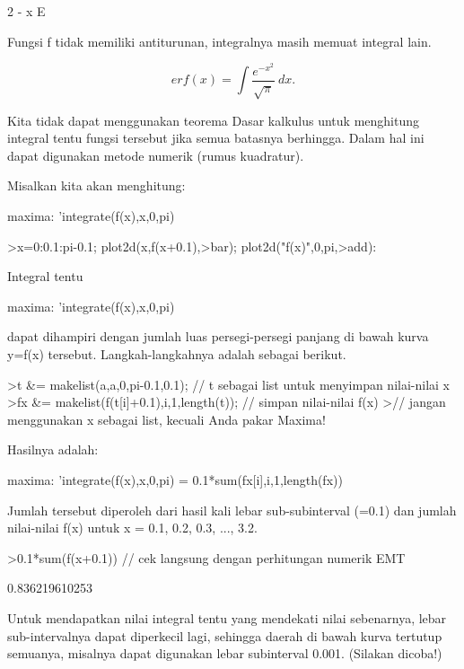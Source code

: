 \documentclass[a4paper,10pt]{article}
\begin{document}
\begin{eulernotebook}
\begin{euleroutput}
                                      2
                                   - x
                                  E
  
\end{euleroutput}
\begin{eulercomment}
Fungsi f tidak memiliki antiturunan, integralnya masih memuat integral lain.

\end{eulercomment}
\begin{eulerformula}
\[
erf(x) = \int \frac{e^{-x^2}}{\sqrt{\pi}} \ dx.
\]
\end{eulerformula}
\begin{eulercomment}
Kita tidak dapat menggunakan teorema Dasar kalkulus untuk menghitung integral tentu fungsi tersebut jika semua batasnya berhingga.
Dalam hal ini dapat digunakan metode numerik (rumus kuadratur).

Misalkan kita akan menghitung:

maxima: 'integrate(f(x),x,0,pi)
\end{eulercomment}
\begin{eulerprompt}
>x=0:0.1:pi-0.1; plot2d(x,f(x+0.1),>bar); plot2d("f(x)",0,pi,>add):
\end{eulerprompt}
\begin{eulercomment}
Integral tentu

maxima: 'integrate(f(x),x,0,pi)

dapat dihampiri dengan jumlah luas persegi-persegi panjang di bawah kurva y=f(x)
tersebut. Langkah-langkahnya adalah sebagai berikut.
\end{eulercomment}
\begin{eulerprompt}
>t &= makelist(a,a,0,pi-0.1,0.1); // t sebagai list untuk menyimpan nilai-nilai x
>fx &= makelist(f(t[i]+0.1),i,1,length(t)); // simpan nilai-nilai f(x)
>// jangan menggunakan x sebagai list, kecuali Anda pakar Maxima!
\end{eulerprompt}
\begin{eulercomment}
Hasilnya adalah:

maxima: 'integrate(f(x),x,0,pi) = 0.1*sum(fx[i],i,1,length(fx))

Jumlah tersebut diperoleh dari hasil kali lebar sub-subinterval (=0.1) dan jumlah nilai-nilai f(x) untuk
x = 0.1, 0.2, 0.3, ..., 3.2.
\end{eulercomment}
\begin{eulerprompt}
>0.1*sum(f(x+0.1)) // cek langsung dengan perhitungan numerik EMT
\end{eulerprompt}
\begin{euleroutput}
  0.836219610253
\end{euleroutput}
\begin{eulercomment}
Untuk mendapatkan nilai integral tentu yang mendekati nilai sebenarnya, lebar
sub-intervalnya dapat diperkecil lagi, sehingga daerah di bawah kurva tertutup
semuanya, misalnya dapat digunakan lebar subinterval 0.001. (Silakan dicoba!)


\end{eulercomment}
\end{eulernotebook}
\end{document}
